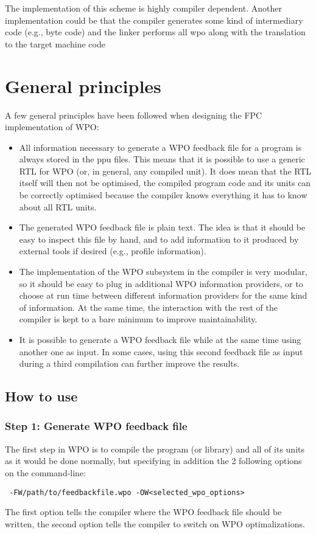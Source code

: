 The implementation of this scheme is highly compiler dependent. Another
implementation could be that the compiler generates some kind of intermediary 
code (e.g., byte code) and the linker performs all wpo along with the translation 
to the target machine code 
\section{General principles}
A few general principles have been followed when designing the FPC
implementation of WPO: 
\begin{itemize} 
\item All information necessary to generate a WPO feedback file for a program is
always stored in the ppu files. This means that it is possible to use a 
generic RTL for WPO (or, in general, any compiled unit). It does mean that 
the RTL itself will then not be optimised, the compiled program code and 
its units can be correctly optimised because the compiler knows everything 
it has to know about all RTL units.
\item The generated WPO feedback file is plain text. The idea is that it should
be easy to inspect this file by hand, and to add information to it produced
by external tools if desired (e.g., profile information).
\item The implementation of the WPO subsystem in the compiler is very modular, 
so it should be easy to plug in additional WPO information providers, or to
choose at run time between different information providers for the same kind
of information. At the same time, the interaction with the rest of the
compiler is kept to a bare minimum to improve maintainability.
\item It is possible to generate a WPO feedback file while at the same time using
another one as input. In some cases, using this second feedback file as
input during a third compilation can further improve the results. 
\end{itemize}

\subsection{How to use}
\subsubsection{Step 1: Generate WPO feedback file}
The first step in WPO is to compile the program (or library) and all of its 
units as it would be done normally, but specifying in addition the 2
following options on the command-line:
\begin{verbatim}
 -FW/path/to/feedbackfile.wpo -OW<selected_wpo_options>
\end{verbatim}
The first option tells the compiler where the WPO feedback file should be
written, the second option tells the compiler to switch on WPO
optimalizations.

